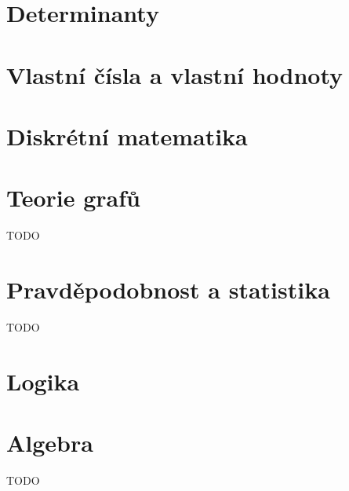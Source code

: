 \section{Determinanty}


\section{Vlastní čísla a vlastní hodnoty}


\section{Diskrétní matematika}


\section{Teorie grafů}
TODO

\section{Pravděpodobnost a statistika}
TODO

\section{Logika}


\section{Algebra}
TODO

